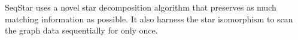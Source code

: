 
SeqStar uses a novel star decomposition algorithm that preserves as much matching information as possible.
It also harness the star isomorphism to scan the graph data sequentially for only once.

